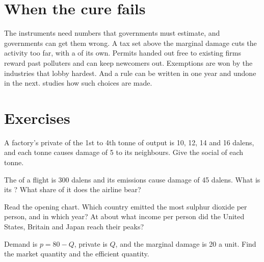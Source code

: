 \section{When the cure fails}\label{sec:g11:externalities:failure}

The instruments need numbers that governments must estimate, and governments can get them wrong. A tax set above the marginal damage cuts the activity too far, with a
 of its own. Permits handed out free to existing firms reward past polluters and can keep newcomers out. Exemptions are won by the industries that lobby
hardest. And a rule can be written in one year and undone in the next.  studies how such choices are made.

\section{Exercises}

\begin{exercise}[$\star$]\label{exo:g11:externalities:1}
A factory's private  of the 1st to 4th tonne of output is 10, 12, 14 and 16 dalens, and each tonne causes damage of 5 to its neighbours. Give the social
 of each tonne.
\end{exercise}

\begin{exercise}[$\star$]\label{exo:g11:externalities:2}
The  of a flight is 300 dalens and its emissions cause damage of 45 dalens. What is its ? What share of it does the airline bear?
\end{exercise}

\begin{exercise}[$\star$]\label{exo:g11:externalities:3}
Read the opening chart. Which country emitted the most sulphur dioxide per person, and in which year? At about what income per person did the United States, Britain
and Japan reach their peaks?
\end{exercise}

\begin{exercise}[$\star$]\label{exo:g11:externalities:4}
Demand is $p = 80 - Q$, private  is $Q$, and the marginal damage is 20 a unit. Find the market quantity and the efficient quantity.
\end{exercise}

